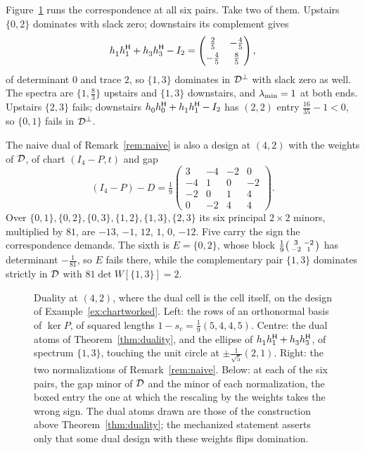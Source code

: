 \begin{example}
Figure~\ref{fig:dualworked} runs the correspondence at all six pairs.  Take
two of them.  Upstairs $\{0,2\}$ dominates with slack
zero; downstairs its complement gives
\[
  h_1^{\vphantom{\mathsf{H}}}h_1\adj+h_3^{\vphantom{\mathsf{H}}}h_3\adj-I_2
   =\begin{pmatrix}\tfrac25&-\tfrac45\\[3pt]
                   -\tfrac45&\tfrac85\end{pmatrix},
\]
of determinant $0$ and trace $2$, so $\{1,3\}$ dominates in $\mathcal{D}^{\perp}$
with slack zero as well.  The spectra are $\{1,\tfrac83\}$ upstairs and
$\{1,3\}$ downstairs, and $\lambda_{\min}=1$ at both ends.  Upstairs $\{2,3\}$
fails; downstairs
$h_0^{\vphantom{\mathsf{H}}}h_0\adj+h_1^{\vphantom{\mathsf{H}}}h_1\adj-I_2$
has $(2,2)$ entry $\tfrac{16}{35}-1<0$, so $\{0,1\}$ fails in
$\mathcal{D}^{\perp}$.

The naive dual of Remark~\ref{rem:naive} is also a design at $(4,2)$ with
the weights of $\mathcal{D}$, of chart $(I_4-P,t)$ and gap
\[
  (I_4-P)-D=\tfrac19\begin{pmatrix}
    3&-4&-2&0\\ -4&1&0&-2\\ -2&0&1&4\\ 0&-2&4&4\end{pmatrix} .
\]
Over $\{0,1\},\{0,2\},\{0,3\},\{1,2\},\{1,3\},\{2,3\}$ its six principal
$2\times2$ minors, multiplied by $81$, are $-13$, $-1$, $12$, $1$, $0$,
$-12$.  Five carry the sign the correspondence demands.  The sixth is
$E=\{0,2\}$, whose block
$\tfrac19\begin{psmallmatrix}3&-2\\-2&1\end{psmallmatrix}$ has
determinant $-\tfrac1{81}$, so $E$ fails there, while the complementary
pair $\{1,3\}$ dominates strictly in $\mathcal{D}$ with $81\det W[\{1,3\}]=2$.
\end{example}

\begin{figure}[ht]
  \centering
  
  \caption{Duality at $(4,2)$, where the dual cell is the cell itself, on
  the design of Example~\ref{ex:chartworked}.  Left: the rows of an
  orthonormal basis of $\ker P$, of squared lengths
  $1-s_c=\tfrac19(5,4,4,5)$.  Centre: the dual atoms of
  Theorem~\ref{thm:duality}, and the ellipse of
  $h_1^{\vphantom{\mathsf{H}}}h_1\adj+h_3^{\vphantom{\mathsf{H}}}h_3\adj$,
  of spectrum $\{1,3\}$, touching the unit circle at
  $\pm\tfrac1{\sqrt5}(2,1)$.  Right: the two normalizations of
  Remark~\ref{rem:naive}.  Below: at each of the six pairs, the gap minor of
  $\mathcal{D}$ and the minor of each normalization, the boxed entry the one at which
  the rescaling by the weights takes the wrong sign.
  The dual atoms drawn are those of the construction above
  Theorem~\ref{thm:duality}; the mechanized statement asserts only that some
  dual design with these weights flips domination.}
  \label{fig:dualworked}
\end{figure}


